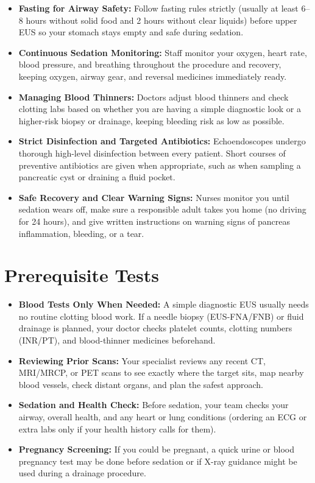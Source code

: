 \begin{itemize}
    \item \textbf{Fasting for Airway Safety:} Follow fasting rules strictly (usually at least 6--8 hours without solid food and 2 hours without clear liquids) before upper EUS so your stomach stays empty and safe during sedation.
    \item \textbf{Continuous Sedation Monitoring:} Staff monitor your oxygen, heart rate, blood pressure, and breathing throughout the procedure and recovery, keeping oxygen, airway gear, and reversal medicines immediately ready.
    \item \textbf{Managing Blood Thinners:} Doctors adjust blood thinners and check clotting labs based on whether you are having a simple diagnostic look or a higher-risk biopsy or drainage, keeping bleeding risk as low as possible.
    \item \textbf{Strict Disinfection and Targeted Antibiotics:} Echoendoscopes undergo thorough high-level disinfection between every patient. Short courses of preventive antibiotics are given when appropriate, such as when sampling a pancreatic cyst or draining a fluid pocket.
    \item \textbf{Safe Recovery and Clear Warning Signs:} Nurses monitor you until sedation wears off, make sure a responsible adult takes you home (no driving for 24 hours), and give written instructions on warning signs of pancreas inflammation, bleeding, or a tear.
\end{itemize}

\section{Prerequisite Tests}

\begin{itemize}
    \item \textbf{Blood Tests Only When Needed:} A simple diagnostic EUS usually needs no routine clotting blood work. If a needle biopsy (EUS-FNA/FNB) or fluid drainage is planned, your doctor checks platelet counts, clotting numbers (INR/PT), and blood-thinner medicines beforehand.
    \item \textbf{Reviewing Prior Scans:} Your specialist reviews any recent CT, MRI/MRCP, or PET scans to see exactly where the target sits, map nearby blood vessels, check distant organs, and plan the safest approach.
    \item \textbf{Sedation and Health Check:} Before sedation, your team checks your airway, overall health, and any heart or lung conditions (ordering an ECG or extra labs only if your health history calls for them).
    \item \textbf{Pregnancy Screening:} If you could be pregnant, a quick urine or blood pregnancy test may be done before sedation or if X-ray guidance might be used during a drainage procedure.
\end{itemize}

